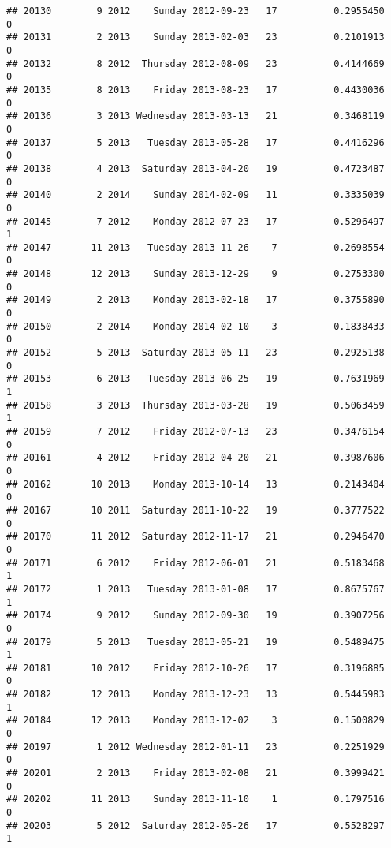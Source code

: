 \documentclass[
]{article}
\begin{document}
\begin{verbatim}
## 20130        9 2012    Sunday 2012-09-23   17          0.2955450             0
## 20131        2 2013    Sunday 2013-02-03   23          0.2101913             0
## 20132        8 2012  Thursday 2012-08-09   23          0.4144669             0
## 20135        8 2013    Friday 2013-08-23   17          0.4430036             0
## 20136        3 2013 Wednesday 2013-03-13   21          0.3468119             0
## 20137        5 2013   Tuesday 2013-05-28   17          0.4416296             0
## 20138        4 2013  Saturday 2013-04-20   19          0.4723487             0
## 20140        2 2014    Sunday 2014-02-09   11          0.3335039             0
## 20145        7 2012    Monday 2012-07-23   17          0.5296497             1
## 20147       11 2013   Tuesday 2013-11-26    7          0.2698554             0
## 20148       12 2013    Sunday 2013-12-29    9          0.2753300             0
## 20149        2 2013    Monday 2013-02-18   17          0.3755890             0
## 20150        2 2014    Monday 2014-02-10    3          0.1838433             0
## 20152        5 2013  Saturday 2013-05-11   23          0.2925138             0
## 20153        6 2013   Tuesday 2013-06-25   19          0.7631969             1
## 20158        3 2013  Thursday 2013-03-28   19          0.5063459             1
## 20159        7 2012    Friday 2012-07-13   23          0.3476154             0
## 20161        4 2012    Friday 2012-04-20   21          0.3987606             0
## 20162       10 2013    Monday 2013-10-14   13          0.2143404             0
## 20167       10 2011  Saturday 2011-10-22   19          0.3777522             0
## 20170       11 2012  Saturday 2012-11-17   21          0.2946470             0
## 20171        6 2012    Friday 2012-06-01   21          0.5183468             1
## 20172        1 2013   Tuesday 2013-01-08   17          0.8675767             1
## 20174        9 2012    Sunday 2012-09-30   19          0.3907256             0
## 20179        5 2013   Tuesday 2013-05-21   19          0.5489475             1
## 20181       10 2012    Friday 2012-10-26   17          0.3196885             0
## 20182       12 2013    Monday 2013-12-23   13          0.5445983             1
## 20184       12 2013    Monday 2013-12-02    3          0.1500829             0
## 20197        1 2012 Wednesday 2012-01-11   23          0.2251929             0
## 20201        2 2013    Friday 2013-02-08   21          0.3999421             0
## 20202       11 2013    Sunday 2013-11-10    1          0.1797516             0
## 20203        5 2012  Saturday 2012-05-26   17          0.5528297             1

\end{verbatim}
\end{document}
